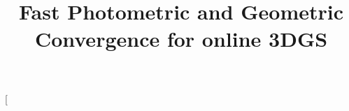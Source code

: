 \documentclass[nth=33]{humantech}
\begin{document}
\title{Fast Photometric and Geometric Convergence for online 3DGS}
\twocolumn[
\begin{@twocolumnfalse}
\begin{flushleft}
\maketitle
\begin{abstract}
\justifying



\end{abstract}
\end{flushleft}
\end{@twocolumnfalse}
\end{document}
